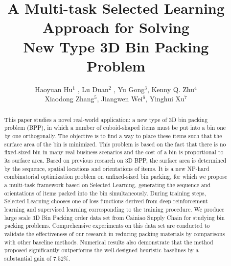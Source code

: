 \documentclass[sigconf]{acmart}
\begin{document}
\title{A Multi-task Selected Learning Approach for Solving \\New Type 3D Bin Packing Problem}




\author{
	Haoyuan Hu$ ^1$ \footnotemark[1], 
	Lu Duan$^2$ \footnotemark[1],
	Yu Gong$^3$,
	Kenny Q. Zhu$^4$ \footnotemark[2] \\
	Xiaodong Zhang$^5$,
	Jiangwen Wei$^6$,
	Yinghui Xu$^7$
}




\renewcommand{\shortauthors}{H. Hu et al.}
\renewcommand{\authors}{Haoyuan Hu, Lu Duan, Yu Gong, Kenny Q. Zhu, Xiaodong Zhang, Jiangwen Wei, Yinghui Xu}
\renewcommand{\shorttitle}{MTSL for New Type 3D BPP}

\begin{abstract}
	This paper studies a novel real-world application: a new type of 3D bin packing problem (BPP), in which a number of cuboid-shaped items must be put into a bin one by one orthogonally. The objective is to find a way to place these items such that the surface area of the bin is minimized. 
This problem is based on the fact that there is no fixed-sized bin in 
many real business scenarios and the cost of a bin is proportional to 
its surface area. Based on previous research on 3D BPP, 
the surface area is determined by the sequence, spatial locations and 
orientations of items. It is a new NP-hard combinatorial optimization 
problem on unfixed-sized bin packing, for which we propose a multi-task 
framework based on Selected Learning, generating the sequence and 
orientations of items packed into the bin simultaneously. 
During training steps, Selected Learning chooses one of loss functions 
derived from deep reinforcement learning and supervised learning corresponding 
to the training procedure. We produce large scale 3D Bin Packing order data 
set from Cainiao Supply Chain for studying bin packing problems. 
Comprehensive experiments on this data set are conducted to validate the 
effectiveness of our research in reducing packing materials by 
comparisons with other baseline methods. %
Numerical results also demonstrate that the method proposed 
significantly outperforms the well-designed heuristic baselines by 
a substantial gain of $7.52\%$.
	
\end{abstract}
\end{document}
